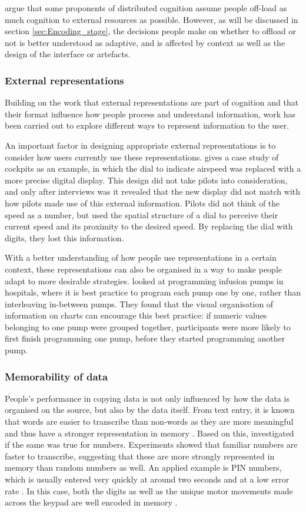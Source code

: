 \citet{Payne2013} argue that some proponents of distributed cognition assume people off-load as much cognition to external resources as possible. However, as will be discussed in section \ref{sec:Encoding_stage}, the decisions people make on whether to offload or not is better understood as adaptive, and is affected by context as well as the design of the interface or artefacts. 

\subsubsection{External representations}
Building on the work that external representations are part of cognition and that their format influence how people process and understand information, work has been carried out to explore different ways to represent information to the user. 

An important factor in designing appropriate external representations is to consider how users currently use these representations. \citet{Hutchins1995} gives a case study of cockpits as an example, in which the dial to indicate airspeed was replaced with a more precise digital display. This design did not take pilots into consideration, and only after interviews was it revealed that the new display did not match with how pilots made use of this external information. Pilots did not think of the speed as a number, but used the spatial structure of a dial to perceive their current speed and its proximity to the desired speed. By replacing the dial with digits, they lost this information. 

With a better understanding of how people use representations in a certain context, these representations can also be organised in a way to make people adapt to more desirable strategies. \citet{Back2013b} looked at programming infusion pumps in hospitals, where it is best practice to program each pump one by one, rather than interleaving in-between pumps. They found that the visual organisation of information on charts can encourage this best practice: if numeric values belonging to one pump were grouped together, participants were more likely to first finish programming one pump, before they started programming another pump.

\subsubsection{Memorability of data}
People's performance in copying data is not only influenced by how the data is organised on the source, but also by the data itself.
From text entry, it is known that words are easier to transcribe than non-words as they are more meaningful and thus have a stronger representation in memory \citep{Salthouse1986}. Based on this, \citet{Wiseman2014} investigated if the same was true for numbers. Experiments showed that familiar numbers are faster to transcribe, suggesting that these are more strongly represented in memory than random numbers as well.
An applied example is PIN numbers, which is usually entered very quickly at around two seconds and at a low error rate \citep{DeLuca2010}. In this case, both the digits as well as the unique motor movements made across the keypad are well encoded in memory \citep{Mangen2010}. 

